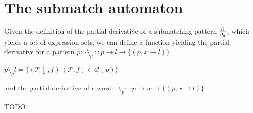 \section{The submatch automaton}
\label{nfa}

Given the definition of the partial derivative of a submatching pattern
$\frac{\partial}{\partial_{a}}$, which yields a set of expression sets, we can define a function
yielding the partial derivative for a pattern $p$:
$\cdot \setminus_p \cdot :: p \to l \to \{(p, x \to l)\}$

$p \setminus_p l = \{ (\mathcal{P}\downarrow, f) | (\mathcal{P}, f) \in \dd{l}(p) \}$

and the partial derivative of a word:
$\cdot \setminus_p \cdot :: p \to w \to \{(p, x \to l)\}$

TODO


